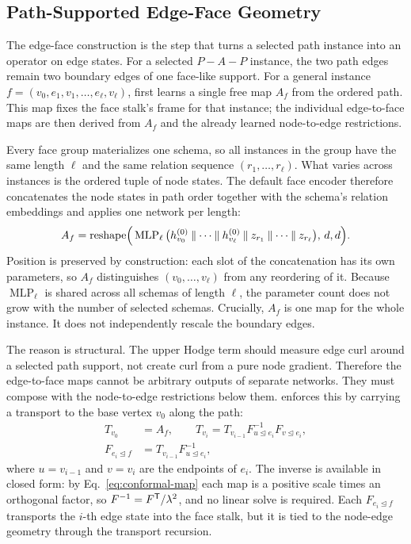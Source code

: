 \subsection{Path-Supported Edge-Face Geometry}
\label{sec:face-geometry}

The edge-face construction is the step that turns a selected path instance into an operator on edge
states.  For a selected \(P\!-\!A\!-\!P\) instance, the two path edges remain two boundary edges of
one face-like support.  For a general instance
\(f=(v_0,e_1,v_1,\ldots,e_\ell,v_\ell)\), \method{} first learns a single free map \(A_f\) from the
ordered path.  This map fixes the face stalk's frame for that instance; the individual
edge-to-face maps are then derived from \(A_f\) and the already learned node-to-edge restrictions.

Every face group materializes one schema, so all instances in the group have the same length
\(\ell\) and the same relation sequence \((r_1,\ldots,r_\ell)\).  What varies across instances is
the ordered tuple of node states.  The default face encoder therefore concatenates the node states
in path order together with the schema's relation embeddings and applies one network per length:
\begin{equation}
  A_f
  =\operatorname{reshape}\!\Big(
    \operatorname{MLP}_{\ell}\big(
      h_{v_0}^{(0)}\mathbin\Vert\cdots\mathbin\Vert h_{v_\ell}^{(0)}
      \mathbin\Vert z_{r_1}\mathbin\Vert\cdots\mathbin\Vert z_{r_\ell}
    \big),\,d,d\Big).
  \label{eq:face-map}
\end{equation}
Position is preserved by construction: each slot of the concatenation has its own parameters, so
\(A_f\) distinguishes \((v_0,\ldots,v_\ell)\) from any reordering of it.  Because
\(\operatorname{MLP}_\ell\) is shared across all schemas of length \(\ell\), the parameter count
does not grow with the number of selected schemas.  Crucially, \(A_f\) is one map for the whole
instance.  It does not independently rescale the boundary edges.

The reason is structural.  The upper Hodge term should measure edge curl around a selected path
support, not create curl from a pure node gradient.  Therefore the edge-to-face maps cannot be
arbitrary outputs of separate networks.  They must compose with the node-to-edge restrictions below
them.  \method{} enforces this by carrying a transport to the base vertex \(v_0\) along the path:
\begin{equation}
  \begin{aligned}
  T_{v_0}&=A_f,
  \qquad
  T_{v_i}=T_{v_{i-1}}F_{u\unlhd e_i}^{-1}F_{v\unlhd e_i},\\
  F_{e_i\unlhd f}&=T_{v_{i-1}}F_{u\unlhd e_i}^{-1},
  \end{aligned}
  \label{eq:transport}
\end{equation}
where \(u=v_{i-1}\) and \(v=v_i\) are the endpoints of \(e_i\).  The inverse is available in closed
form: by Eq.~\eqref{eq:conformal-map} each map is a positive scale times an orthogonal factor, so
\(F^{-1}=F^{\mathsf{T}}/\lambda^2\), and no linear solve is required.  Each
\(F_{e_i\unlhd f}\) transports the \(i\)-th edge state into the face stalk, but it is tied to the
node-edge geometry through the transport recursion.

